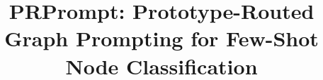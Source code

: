 \documentclass[11pt]{article}
\title{PRPrompt: Prototype-Routed Graph Prompting for Few-Shot Node Classification}
\author{}
\date{}
\begin{document}
\maketitle

\begingroup
\small
\raggedright


\endgroup
\clearpage
\appendix
\small

\end{document}
